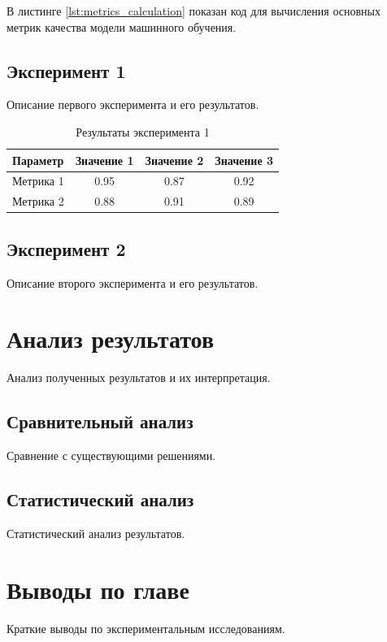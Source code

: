 В листинге \ref{lst:metrics_calculation} показан код для вычисления основных метрик качества модели машинного обучения.

\subsection{Эксперимент 1}

Описание первого эксперимента и его результатов.

\begin{table}[H]
\centering
\caption{Результаты эксперимента 1}
\begin{tabular}{|l|c|c|c|}
\hline
Параметр & Значение 1 & Значение 2 & Значение 3 \\
\hline
Метрика 1 & 0.95 & 0.87 & 0.92 \\
Метрика 2 & 0.88 & 0.91 & 0.89 \\
\hline
\end{tabular}
\label{tab:exp1}
\end{table}

\subsection{Эксперимент 2}

Описание второго эксперимента и его результатов.

\section{Анализ результатов}

Анализ полученных результатов и их интерпретация.

\subsection{Сравнительный анализ}

Сравнение с существующими решениями.

\subsection{Статистический анализ}

Статистический анализ результатов.

\section{Выводы по главе}

Краткие выводы по экспериментальным исследованиям.
